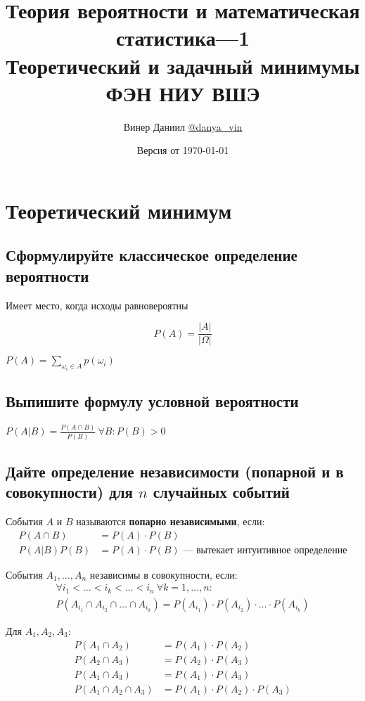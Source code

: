 \documentclass{article}
\title{\LARGE{Теория вероятности и математическая статистика—1}\\
Теоретический и задачный минимумы\\
ФЭН НИУ ВШЭ}
\author{Винер Даниил  \href{https://t.me/danya_vin}{@danya\_vin}}
\date{Версия от \today}
\begin{document}
\maketitle
\tableofcontents
\newpage
\setlength{\parindent}{15pt}
\setlength{\parskip}{2mm}
\section{Теоретический минимум}
\subsection{Сформулируйте классическое определение вероятности}
Имеет место, когда исходы равновероятны

$$P(A)=\displaystyle\frac{|A|}{|\Omega|}$$

 $P(A)=\sum_{\omega_i\in A}p(\omega_i)$
\subsection{Выпишите формулу условной вероятности}
$P(A|B)=\displaystyle\frac{P(A\cap B)}{P(B)}\ \forall B: P(B)>0$

\subsection{Дайте определение независимости (попарной и в совокупности) для $n$ случайных событий}
 События $A\text{ и }B$ называются \textbf{попарно независимыми}, если:
\begin{equation*}
    \begin{aligned}
        P(A\cap B)&=P(A)\cdot P(B)\\
        P(A|B)P(B)&=P(A)\cdot P(B)\text{ — вытекает интуитивное определение}
    \end{aligned}
\end{equation*}

 События $A_1,\ldots, A_n$ независимы в совокупности, если:
\begin{equation*}
    \begin{aligned}
    \forall i_1<\ldots<i_k<\ldots<i_n\ \forall k=1,\ldots,n:\\ P(A_{i_1}\cap A_{i_2}\cap\ldots\cap A_{i_k})=P(A_{i_1})\cdot P(A_{i_2})\cdot \ldots\cdot P(A_{i_k})
    \end{aligned}
\end{equation*}

\comment  Для $A_1,A_2,A_3$:
\begin{equation*}
    \begin{aligned}
        P(A_1\cap A_2)&=P(A_1)\cdot P(A_2)\\
        P(A_2\cap A_3)&=P(A_2)\cdot P(A_3)\\
        P(A_1\cap A_3)&=P(A_1)\cdot P(A_3)\\
        P(A_1\cap A_2\cap A_3)&=P(A_1)\cdot P(A_2)\cdot P(A_3)
    \end{aligned}
\end{equation*}
\end{document}
